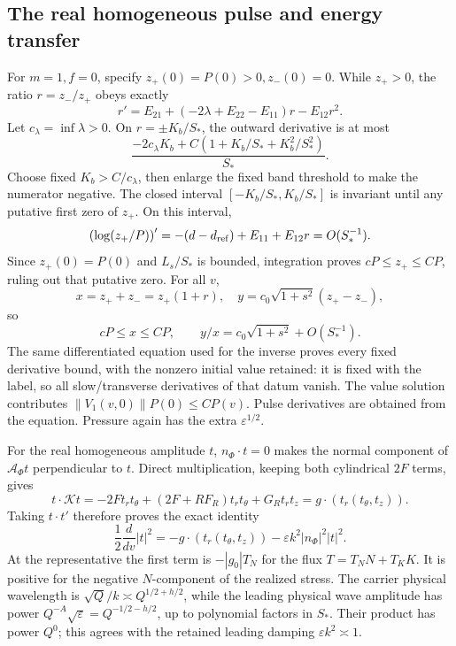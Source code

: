\documentclass[10pt,a4paper]{article}
\begin{document}
\subsection{The real homogeneous pulse and energy transfer}\label{si:the-real-homogeneous-pulse-and-energy-transfer}

For \(m=1,f=0\), specify \(z_+(0)=P(0)>0,z_-(0)=0\). While \(z_+>0\), the ratio \(r=z_-/z_+\) obeys exactly \[
r'=E_{21}+(-2\lambda+E_{22}-E_{11})r-E_{12}r^2.
\] Let \(c_\lambda=\inf\lambda>0\). On \(r=\pm K_b/S_*\), the outward derivative is at most \[
\frac{-2c_\lambda K_b+C(1+K_b/S_*+K_b^2/S_*^2)}{S_*}.
\] Choose fixed \(K_b>C/c_\lambda\), then enlarge the fixed band threshold to make the numerator negative. The closed interval \([-K_b/S_*,K_b/S_*]\) is invariant until any putative first zero of \(z_+\). On this interval, \[
\left(\log(z_+/P)\right)'=-(d-d_{\rm ref})+E_{11}+E_{12}r=O(S_*^{-1}).
\] Since \(z_+(0)=P(0)\) and \(L_s/S_*\) is bounded, integration proves \(cP\le z_+\le CP\), ruling out that putative zero. For all \(v\), \[
x=z_++z_-=z_+(1+r),\quad
y=c_0\sqrt{1+s^2}(z_+-z_-),
\] so \[
cP\le x\le CP,\qquad
y/x=c_0\sqrt{1+s^2}+O(S_*^{-1}).
\] The same differentiated equation used for the inverse proves every fixed derivative bound, with the nonzero initial value retained: it is fixed with the label, so all slow/transverse derivatives of that datum vanish. The value solution contributes \(\|V_1(v,0)\|P(0)\le CP(v)\). Pulse derivatives are obtained from the equation. Pressure again has the extra \(\varepsilon^{1/2}\).

For the real homogeneous amplitude \(t\), \(n_\Phi\cdot t=0\) makes the normal component of \(\mathcal A_\Phi t\) perpendicular to \(t\). Direct multiplication, keeping both cylindrical \(2F\) terms, gives \[
t\cdot\mathcal Kt
=-2Ft_rt_\theta+(2F+RF_R)t_rt_\theta+G_Rt_rt_z
=g\cdot(t_r(t_\theta,t_z)).
\] Taking \(t\cdot t'\) therefore proves the exact identity \[
\frac12\frac{d}{dv}|t|^2
=-g\cdot(t_r(t_\theta,t_z))-\varepsilon k^2|n_\Phi|^2|t|^2.
\] At the representative the first term is \(-|g_0|T_N\) for the flux \(T=T_NN+T_KK\). It is positive for the negative \(N\)-component of the realized stress. The carrier physical wavelength is \(\sqrt Q/k\asymp Q^{1/2+h/2}\), while the leading physical wave amplitude has power \(Q^{-A}\sqrt\varepsilon=Q^{-1/2-h/2}\), up to polynomial factors in \(S_*\). Their product has power \(Q^0\); this agrees with the retained leading damping \(\varepsilon k^2\asymp1\).
\end{document}
